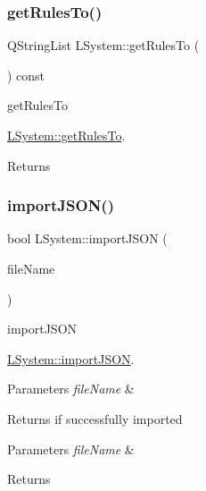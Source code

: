 \subsubsection{\texorpdfstring{get\+Rules\+To()}{getRulesTo()}}
{\footnotesize\ttfamily Q\+String\+List L\+System\+::get\+Rules\+To (\begin{DoxyParamCaption}{ }\end{DoxyParamCaption}) const}



get\+Rules\+To 

\hyperlink{classLSystem_aae9f8d83e3f0b2ad3805ce7cfe423754}{L\+System\+::get\+Rules\+To}.

\begin{DoxyReturn}{Returns}

\end{DoxyReturn}
\mbox{\label{classLSystem_ab7987f060d378683ea3a5aadbf652fb8}} 
\subsubsection{\texorpdfstring{import\+J\+S\+O\+N()}{importJSON()}}
{\footnotesize\ttfamily bool L\+System\+::import\+J\+S\+ON (\begin{DoxyParamCaption}\item[{Q\+String}]{file\+Name }\end{DoxyParamCaption})}



import\+J\+S\+ON 

\hyperlink{classLSystem_ab7987f060d378683ea3a5aadbf652fb8}{L\+System\+::import\+J\+S\+ON}.


\begin{DoxyParams}{Parameters}
{\em file\+Name} & \\
\hline
\end{DoxyParams}
\begin{DoxyReturn}{Returns}
if successfully imported
\end{DoxyReturn}

\begin{DoxyParams}{Parameters}
{\em file\+Name} & \\
\hline
\end{DoxyParams}
\begin{DoxyReturn}{Returns}

\end{DoxyReturn}
\mbox{\label{classLSystem_a75600a935cbd5bbdcb27168489657f48}} 
